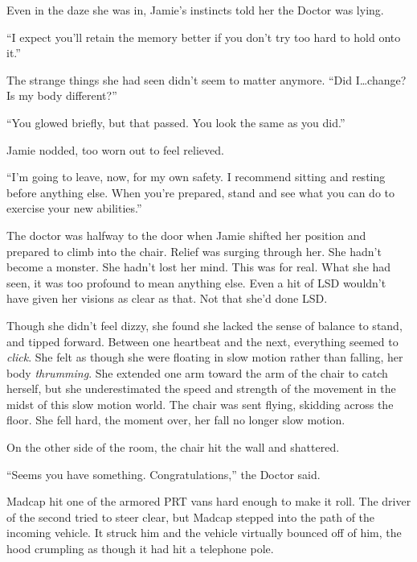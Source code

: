 Even in the daze she was in, Jamie's instincts told her the Doctor was lying.



``I expect you'll retain the memory better if you don't try too hard to hold onto it.''



The strange things she had seen didn't seem to matter anymore.  ``Did I\ldots change?  Is my body different?''



``You glowed briefly, but that passed.  You look the same as you did.''



Jamie nodded, too worn out to feel relieved.



``I'm going to leave, now, for my own safety.  I recommend sitting and resting before anything else.  When you're prepared, stand and see what you can do to exercise your new abilities.''



The doctor was halfway to the door when Jamie shifted her position and prepared to climb into the chair.  Relief was surging through her.  She hadn't become a monster.  She hadn't lost her mind.  This was for real.  What she had seen, it was too profound to mean anything else.  Even a hit of LSD wouldn't have given her visions as clear as that.  Not that she'd done LSD.



Though she didn't feel dizzy, she found she lacked the sense of balance to stand, and tipped forward.  Between one heartbeat and the next, everything seemed to \emph{click}.  She felt as though she were floating in slow motion rather than falling, her body \emph{thrumming}.  She extended one arm toward the arm of the chair to catch herself, but she underestimated the speed and strength of the movement in the midst of this slow motion world.  The chair was sent flying, skidding across the floor.  She fell hard, the moment over, her fall no longer slow motion.



On the other side of the room, the chair hit the wall and shattered.



``Seems you have something.  Congratulations,'' the Doctor said.



\sectionbreak



Madcap hit one of the armored PRT vans hard enough to make it roll.  The driver of the second tried to steer clear, but Madcap stepped into the path of the incoming vehicle.  It struck him and the vehicle virtually bounced off of him, the hood crumpling as though it had hit a telephone pole.



